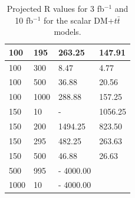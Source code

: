 \begin{table}[h!]
\begin{table}
\begin{tabular}{llll}
    100     & 195     & 263.25  & 147.91 \\ \hline
    100     & 300     & 8.47    & 4.77 \\ \hline
    100     & 500     & 36.88   & 20.56 \\ \hline
    100     & 1000    & 288.88  & 157.25 \\ \hline 
    150     & 10      & -       & 1056.25 \\ \hline
    150     & 200     & 1494.25 & 823.50 \\ \hline
    150     & 295     & 482.25  & 263.63 \\ \hline
    150     & 500     & 46.88   & 26.63 \\ \hline
    500     & 995     & -       4000.00 \\ \hline
    1000    & 10      & -       4000.00 \\ \hline
  \end{tabular}
  \caption{Projected R values for 3 fb$^{-1}$ and 10 fb$^{-1}$ for the scalar  DM+$t\bar{t}$ models.
    \label{tab:dmtt_S_R_values}}
\end{table}


\end{table}
